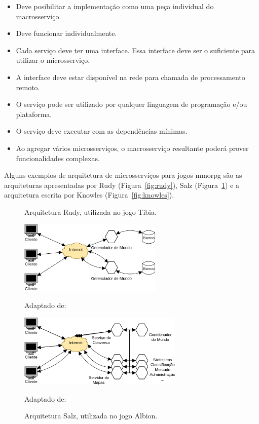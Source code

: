 \begin{itemize}
  \item Deve posibilitar a implementação como uma peça individual do macrosserviço.
  \item Deve funcionar individualmente.
  \item Cada serviço deve ter uma interface. Essa interface deve ser o suficiente para utilizar o microsserviço.
  \item A interface deve estar disponível na rede para chamada de processamento remoto.
  \item O serviço pode ser utilizado por qualquer linguagem de programação e/ou plataforma.
  \item O serviço deve executar com as dependências mínimas.
  \item Ao agregar vários microsserviços, o macrosserviço resultante poderá prover funcionalidades complexas.
\end{itemize}

Alguns exemplos de arquitetura de microsserviços para jogos \ac{mmorpg} são as arquiteturas apresentadas por Rudy (Figura~\ref{fig:rudy}), Salz (Figura~\ref{fig:salz}) e a arquitetura escrita por Knowles (Figura~\ref{fig:knowles}).

\begin{figure}[htb!]
  \begin{minipage}{.5\textwidth}
    \caption{Arquitetura Rudy, utilizada no jogo Tibia.}
    \label{fig:rudy}
    \includegraphics[height=3.5cm]{arquiteturas/rudy.png}
    \centering

    Adaptado de:~\cite{matthiasrudy2011}
  \end{minipage}
  \begin{minipage}{.5\textwidth}
    \caption{Arquitetura Salz, utilizada no jogo Albion.}
    \label{fig:salz}
    \includegraphics[height=3.5cm]{arquiteturas/salz.png}
    \centering

    Adaptado de:~\cite{albion_online_unite}
  \end{minipage}%
\end{figure}

